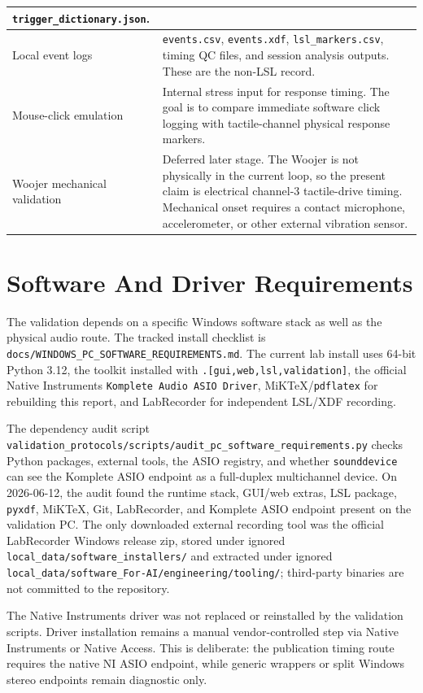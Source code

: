\documentclass[11pt]{article}
\begin{document}
\begin{longtable}{|p{}|p{}|}
\texttt{trigger\_dictionary.json}. \\
\hline
Local event logs & \texttt{events.csv}, \texttt{events.xdf},
\texttt{lsl\_markers.csv}, timing QC files, and session analysis outputs.
These are the non-LSL record. \\
\hline
Mouse-click emulation & Internal stress input for response timing. The goal is
to compare immediate software click logging with tactile-channel physical
response markers. \\
\hline
Woojer mechanical validation & Deferred later stage. The Woojer is not
physically in the current loop, so the present claim is electrical channel-3
tactile-drive timing. Mechanical onset requires a contact microphone,
accelerometer, or other external vibration sensor. \\
\hline
\end{longtable}

\section{Software And Driver Requirements}

The validation depends on a specific Windows software stack as well as the
physical audio route. The tracked install checklist is
\texttt{docs/WINDOWS\_PC\_SOFTWARE\_REQUIREMENTS.md}. The current lab install
uses 64-bit Python 3.12, the toolkit installed with
\texttt{.[gui,web,lsl,validation]}, the official Native Instruments
\texttt{Komplete Audio ASIO Driver}, MiKTeX/\texttt{pdflatex} for rebuilding
this report, and LabRecorder for independent LSL/XDF recording.

The dependency audit script
\texttt{validation\_protocols/scripts/audit\_pc\_software\_requirements.py}
checks Python packages, external tools, the ASIO registry, and whether
\texttt{sounddevice} can see the Komplete ASIO endpoint as a full-duplex
multichannel device. On 2026-06-12, the audit found the runtime stack, GUI/web
extras, LSL package, \texttt{pyxdf}, MiKTeX, Git, LabRecorder, and Komplete
ASIO endpoint present on the validation PC. The only downloaded external
recording tool was the official LabRecorder Windows release zip, stored under
ignored \texttt{local\_data/software\_installers/} and extracted under ignored
\texttt{local\_data/software\_For-AI/engineering/tooling/}; third-party binaries are not committed to
the repository.

The Native Instruments driver was not replaced or reinstalled by the validation
scripts. Driver installation remains a manual vendor-controlled step via Native
Instruments or Native Access. This is deliberate: the publication timing route
requires the native NI ASIO endpoint, while generic wrappers or split Windows
stereo endpoints remain diagnostic only.
\end{document}
